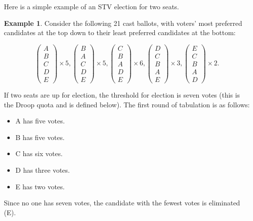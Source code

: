 \documentclass{amsart}
\theoremstyle{definition}
\newtheorem{example}{Example}
\begin{document}
Here is a simple example of an STV election for two seats. 
\begin{example}
    Consider the following 21 cast ballots, with voters' most preferred candidates at the top 
    down to their least preferred candidates at the bottom:
    
    \[\begin{pmatrix}
        A\\B\\C\\D\\E
    \end{pmatrix} \times 5, \begin{pmatrix}
        B\\A\\C\\D\\E
    \end{pmatrix} \times 5, \begin{pmatrix}
        C\\B\\A\\D\\E
    \end{pmatrix} \times 6,
    \begin{pmatrix}
        D\\C\\B\\A\\E
    \end{pmatrix} \times 3, 
    \begin{pmatrix}
        E\\C\\B\\A\\D
    \end{pmatrix} \times 2.\]
    
    If two seats are up for election,  the threshold for election is seven votes (this is 
    the Droop quota and is defined below).
    The first round of tabulation is as follows:
    \begin{itemize}
        \item A has five votes.
        \item B has five votes.
        \item C has six votes.
        \item D has three votes.
        \item E has two votes.
    \end{itemize}
    Since no one has seven votes, the candidate with the fewest votes is eliminated (E).


\end{example}
\end{document}
